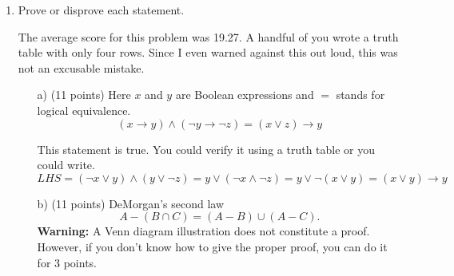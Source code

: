 \documentclass[12pt]{article}
\newtheorem*{solution}{Solution}
\begin{document}
\begin{enumerate}
\begin{solution}
Clearly, $|B_i|=2\cdot 2^{12}$ as we can choose the color of the $i$th row to be either all black or all white, and the color of the remaining 12 squares can be colored arbitrarily. 

Similarly, $|B_i\cap B_j|=2^2\cdot 2^8$ as there are $2$ ways to chose black/white for the $i$th row, $2$ ways to do the same for the $j$th row and the remaining $8$ squares can be colored arbitrarily.

Along the same logic, one can show $|B_i\cap B_j\cap B_k|= 2^3\cdot 2^4$ and $|B_i\cap B_j\cap B_k\cap B_l|=2^4$. Plugging it back to the formula for $|B|$ and substracting $|B|$ from the total number of possible coloring gives the answer to the question.

To get a numerical value (You did not need to do this necessarily to get full score.), note that we can write
\[
|B|=\sum_{m=1}^4\binom{4}{m}(-1)^{i-1}2^m 2^{4(4-m)}.
\]
Then if $|G|$ is the number of good colorings then
\[
|G|=2^{16}-|B|=\sum_{m=0}^4\binom{4}{m}(-1)^m2^m2^{4(4-m)}=(2^4-2)^4=14^4
\]

\end{solution}

\newpage
\item Prove or disprove each statement.

The average score for this problem was 19.27. A handful of you wrote a truth table with only four rows. Since I even warned against this out loud, this was not an excusable mistake.

\begin{itemize}
\item[a)] (11 points) Here $x$ and $y$ are Boolean expressions and $=$ stands for logical equivalence. 
\[
(x\to y)\wedge(\neg y\to\neg z)=(x\vee z)\to y
\]

This statement is true. You could verify it using a truth table or you could write.
\[
LHS = (\neg x \vee y)\wedge(y\vee\neg z)= y\vee (\neg x\wedge \neg z)=y\vee \neg(x\vee y)=(x\vee y)\to y
\]
\item[b)] (11 points) DeMorgan's second law
\[
 A-(B\cap C)=(A-B)\cup (A-C).
\]
\textbf{Warning:} A Venn diagram illustration does not constitute a proof. However, if you don't know how to give the proper proof, you can do it for 3 points.


\end{itemize}
\end{enumerate}
\end{document}
